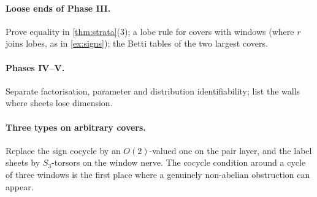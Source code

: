 \documentclass[11pt]{article}
\theoremstyle{definition}\newtheorem{definition}[theorem]{Definition}\newtheorem{remark}[theorem]{Remark}\newtheorem{example}[theorem]{Example}
\begin{document}
\paragraph{Loose ends of Phase III.} Prove equality in \cref{thm:strata}(3); a lobe rule for covers with windows (where $r$ joins
lobes, as in \cref{ex:signs}); the Betti tables of the two largest covers.

\paragraph{Phases IV--V.} Separate factorisation, parameter and distribution identifiability; list the walls where sheets lose
dimension.

\paragraph{Three types on arbitrary covers.} Replace the sign cocycle by an $O(2)$-valued one on the pair layer, and the label sheets by
$S_3$-torsors on the window nerve. The cocycle condition around a cycle of three windows is the first place where a genuinely
non-abelian obstruction can appear.
\end{document}
